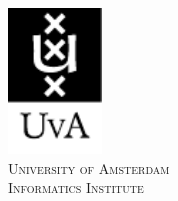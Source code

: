 \begin{titlepage}

\includegraphics[width=2.5cm]{figures/uva-logo.pdf}\\ %
\textsc{\large
        University of Amsterdam\\Informatics Institute
}\\[1.0cm]
 

\vfill %

\end{titlepage}

